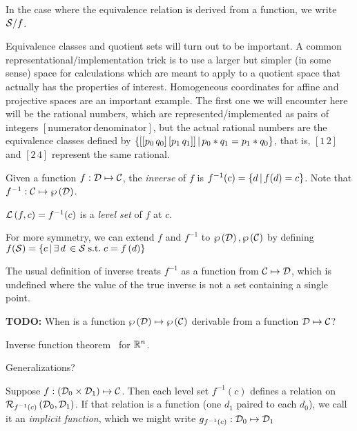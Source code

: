 In the case where the equivalence relation is derived from a
function, we write $\mathcal{S} / f$.

Equivalence classes and quotient sets will turn out to be
important. A common representational/implementation trick is to
use a larger but simpler (in some sense) space for calculations
which are meant to apply to a quotient space that actually has the
properties of interest. Homogeneous coordinates for affine and
projective spaces  are an important example.
The first one we will encounter here will be the rational numbers,
which are represented/implemented as pairs of integers
$[\text{numerator} \, \text{denominator}]$, but the actual
rational numbers are the equivalence classes defined by 
$ \left\{  [[p_0 \, q_0] \, [p_1 \, q_1]] \, | \, p_0*q_1 = p_1*q_0  \right\} $,
that is, $[1 \, 2]$ and $[2 \, 4]$ represent the same rational.

\label{sec:Inverses-and-pseudo-inverses}

Given a function $f : \mathcal{D} \mapsto \mathcal{C}$,
the \textit{inverse} of $f$ is 
$f^{-1}(c) =  \left\{ d \, | \, f(d) = c \right\} $.
Note that $f^{-1} : \mathcal{C}  \mapsto  \wp \left( \mathcal{D} \right) $.

$\mathcal{L}\left( f , c \right) = f^{-1}(c)$ is a \textit{level set} of
$f$ at $c$.

For more symmetry, we can extend $f$ and $f^{-1}$ to 
$ \wp \left( \mathcal{D} \right)   ,  \wp \left( \mathcal{C} \right) $
by defining
$f(\mathcal{S}) = 
 \left\{ c \, | \, \exists \, d \, \in \mathcal{S} \; \text{s.t.} \; c = f \left( d \right) \right\} $

The usual definition of inverse treats $f^{-1}$
as a function from $\mathcal{C} \mapsto \mathcal{D}$,
which is undefined where the value of the true
inverse is not a set containing a single point.

\textbf{TODO:} When is a function 
$ \wp \left( \mathcal{D} \right)   \mapsto  \wp \left( \mathcal{C} \right) $
derivable from a function $\mathcal{D} \mapsto \mathcal{C}$?

Inverse function theorem~\cite[Theorem~2-1]{spivak-1965}
for $\mathbb{R}^n$. 

Generalizations?~\cite{wiki:InverseFunctionTheorem}

\label{sec:Implicit-functions}

Suppose 
$f : \left( \mathcal{D}_0 \times \mathcal{D}_1 \right) \mapsto \mathcal{C}$.
Then each level set $f^{-1}\left( c \right)$ defines a relation on 
$\mathcal{R}_{f^{-1}(c)} \left( \mathcal{D}_0 , \mathcal{D}_1 \right)$.
If that relation is a function
(one $d_1$ paired to each $d_0$),
we call it an \textit{implicit function},
which we might write $g_{f^{-1}(c)} : \mathcal{D}_0 \mapsto \mathcal{D}_1$

